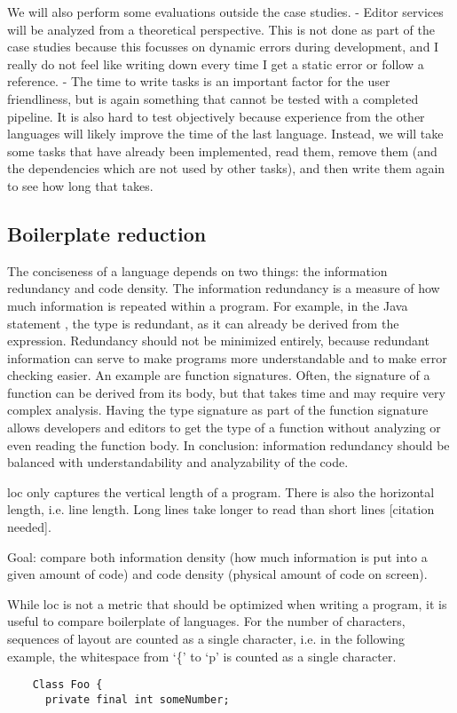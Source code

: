 We will also perform some evaluations outside the case studies.
- Editor services will be analyzed from a theoretical perspective. This is not done as part of the case studies because this focusses on dynamic errors during development, and I really do not feel like writing down every time I get a static error or follow a reference.
- The time to write tasks is an important factor for the user friendliness, but is again something that cannot be tested with a completed pipeline. It is also hard to test objectively because experience from the other languages will likely improve the time of the last language. Instead, we will take some tasks that have already been implemented, read them, remove them (and the dependencies which are not used by other tasks), and then write them again to see how long that takes.


\subsection{Boilerplate reduction}
\label{subsec:evaluation__analysis__boilerplate_reduction}

The conciseness of a language depends on two things: the information redundancy and code density.
The information redundancy is a measure of how much information is repeated within a program.
For example, in the Java statement , the type  is redundant, as it can already be derived from the expression.
Redundancy should not be minimized entirely, because redundant information can serve to make programs more understandable and to make error checking easier.
An example are function signatures.
Often, the signature of a function can be derived from its body, but that takes time and may require very complex analysis.
Having the type signature as part of the function signature allows developers and editors to get the type of a function without analyzing or even reading the function body.
In conclusion: information redundancy should be balanced with understandability and analyzability of the code.

\Ac{loc} only captures the vertical length of a program.
There is also the horizontal length, i.e. line length.
Long lines take longer to read than short lines [citation needed].


Goal: compare both information density (how much information is put into a given amount of code) and code density (physical amount of code on screen).

While \ac{loc} is not a metric that should be optimized when writing a program, it is useful to compare boilerplate of languages.
For the number of characters, sequences of layout are counted as a single character, i.e. in the following example, the whitespace from `\{' to `p' is counted as a single character.
\begin{lstlisting}
    Class Foo {
      private final int someNumber;
\end{lstlisting}


